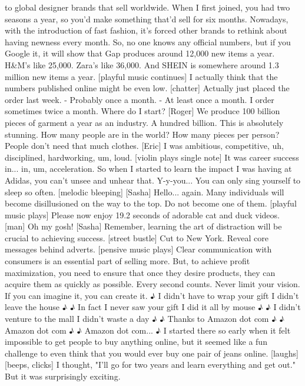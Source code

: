 \documentclass[a4paper]{article}
\begin{document}
	to global designer brands that sell worldwide.
	When I first joined, you had two seasons a year,
	so you'd make something that'd sell for six months.
	Nowadays, with the introduction of fast fashion,
	it's forced other brands to rethink about having newness every month.
	So, no one knows any official numbers, but if you Google it,
	it will show that Gap produces around 12,000 new items a year.
	H\&M's like 25,000.
	Zara's like 36,000.
	And SHEIN is somewhere around 1.3 million new items a year.
	[playful music continues]
	I actually think that the numbers published online might be even low.
	[chatter]
	Actually just placed the order last week.
	- Probably once a month. - At least once a month.
	I order sometimes twice a month.
	Where do I start?
	[Roger] We produce 100 billion pieces of garment a year as an industry.
	A hundred billion.
	This is absolutely stunning.
	How many people are in the world?
	How many pieces per person? People don't need that much clothes.
	[Eric] I was ambitious,
	competitive,
	uh, disciplined, hardworking, um,
	loud.
	[violin plays single note]
	It was career success in... in, um, acceleration.
	So when I started to learn the impact I was having at Adidas,
	you can't unsee and unhear that.
	Y-y-you...
	You can only sing yourself to sleep so often.
	[melodic bleeping]
	[Sasha] Hello... again.
	Many individuals will become disillusioned on the way to the top.
	Do not become one of them.
	[playful music plays]
	Please now enjoy
	19.2 seconds of adorable cat and duck videos.
	[man] Oh my gosh!
	[Sasha] Remember, learning the art of distraction
	will be crucial to achieving success.
	[street bustle]
	Cut to New York.
	Reveal core messages behind adverts.
	[pensive music plays]
	Clear communication with consumers
	is an essential part of selling more.
	But, to achieve profit maximization,
	you need to ensure that once they desire products,
	they can acquire them as quickly as possible.
	Every second counts.
	Never limit your vision.
	If you can imagine it, you can create it.
	♪ I didn't have to wrap your gift I didn't leave the house ♪
	♪ In fact I never saw your gift I did it all by mouse ♪
	♪ I didn't venture to the mall I didn't waste a day ♪
	♪ Thanks to Amazon dot com ♪
	♪ Amazon dot com ♪
	♪ Amazon dot com... ♪
	I started there so early
	when it felt impossible to get people to buy anything online,
	but it seemed like a fun challenge
	to even think that you would ever buy one pair of jeans online. [laughs]
	[beeps, clicks]
	I thought, "I'll go for two years and learn everything and get out."
	But it was surprisingly exciting.
\end{document}
